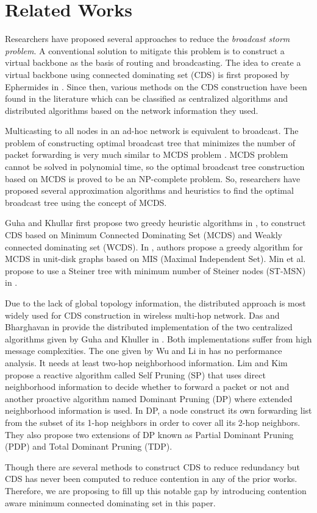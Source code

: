 \section{Related Works}
\label{literature}

Researchers have proposed several approaches to reduce the \textit{broadcast storm problem}. A conventional solution to mitigate this problem is to construct a virtual backbone as the basis of routing and broadcasting. The idea to create a virtual backbone using connected dominating set (CDS) is first proposed by Ephermides in \cite{ephremides1987design}. Since then, various methods on the CDS construction have been found in the literature which can be classified as centralized algorithms %
and distributed algorithms %
based on the network information they used.

Multicasting to all nodes in an ad-hoc network is equivalent to broadcast. The problem of constructing optimal broadcast tree that minimizes the number of packet forwarding is very much similar to MCDS problem \cite{lichtenstein1982planar}. MCDS problem cannot be solved in polynomial time, so the optimal broadcast tree construction based on MCDS is proved to be an NP-complete problem. So, researchers have proposed several approximation algorithms and heuristics to find the optimal broadcast tree using the concept of MCDS. 
 
Guha and Khullar first propose two greedy heuristic algorithms in \cite{guha1998approximation}, to construct CDS based on Minimum Connected Dominating Set (MCDS) and Weakly connected dominating set (WCDS). %
In \cite{cheng2004approximation}, authors propose a greedy algorithm for MCDS in unit-disk graphs based on MIS (Maximal Independent Set). Min et al. propose to use a Steiner tree with minimum number of Steiner nodes (ST-MSN) in \cite{min2006improving}.

Due to the lack of global topology information, the distributed approach is most widely used for CDS construction in wireless multi-hop network. Das and Bharghavan in \cite{das1997routing} provide the distributed implementation of the two centralized algorithms given by Guha and Khuller in \cite{guha1998approximation}. Both implementations suffer from high message complexities. The one given by Wu and Li in \cite {wu1999calculating} has no performance analysis. It needs at least two-hop neighborhood information. Lim and Kim ~\cite{lim2001flooding} propose a reactive algorithm called Self Pruning (SP) that uses direct neighborhood information to decide whether to forward a packet or not and another proactive algorithm named Dominant Pruning (DP) where extended neighborhood information is used. In DP, a node construct its own forwarding list from the subset of its 1-hop neighbors in order to cover all its 2-hop neighbors. They also propose two extensions of DP known as Partial Dominant Pruning (PDP) and Total Dominant Pruning (TDP).

Though there are several methods to construct CDS to reduce redundancy but CDS has never been computed to reduce contention in any of the prior works. Therefore, we are proposing to fill up this notable gap by introducing contention aware minimum connected dominating set in this paper.


